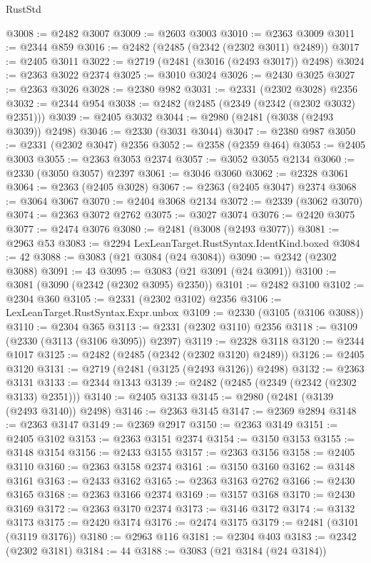 \begin{lexlean}{RustStd}
\begin{coremodule}
@3008 := @2482 @3007
@3009 := @2603 @3003
@3010 := @2363 @3009
@3011 := @2344 @859
@3016 := @2482 (@2485 (@2342 (@2302 @3011) @2489))
@3017 := @2405 @3011
@3022 := @2719 (@2481 (@3016 (@2493 @3017)) @2498)
@3024 := @2363 @3022 @2374
@3025 := @3010 @3024
@3026 := @2430 @3025
@3027 := @2363 @3026
@3028 := @2380 @982
@3031 := @2331 (@2302 @3028) @2356
@3032 := @2344 @954
@3038 := @2482 (@2485 (@2349 (@2342 (@2302 @3032) @2351)))
@3039 := @2405 @3032
@3044 := @2980 (@2481 (@3038 (@2493 @3039)) @2498)
@3046 := @2330 (@3031 @3044)
@3047 := @2380 @987
@3050 := @2331 (@2302 @3047) @2356
@3052 := @2358 (@2359 @464)
@3053 := @2405 @3003
@3055 := @2363 @3053 @2374
@3057 := @3052 @3055 @2134
@3060 := @2330 (@3050 @3057) @2397
@3061 := @3046 @3060
@3062 := @2328 @3061
@3064 := @2363 (@2405 @3028)
@3067 := @2363 (@2405 @3047) @2374
@3068 := @3064 @3067
@3070 := @2404 @3068 @2134
@3072 := @2339 (@3062 @3070)
@3074 := @2363 @3072 @2762
@3075 := @3027 @3074
@3076 := @2420 @3075
@3077 := @2474 @3076
@3080 := @2481 (@3008 (@2493 @3077))
@3081 := @2963 @53
@3083 := @2294 LexLeanTarget.RustSyntax.IdentKind.boxed
@3084 := 42
@3088 := @3083 (@21 @3084 (@24 @3084))
@3090 := @2342 (@2302 @3088)
@3091 := 43
@3095 := @3083 (@21 @3091 (@24 @3091))
@3100 := @3081 (@3090 (@2342 (@2302 @3095) @2350))
@3101 := @2482 @3100
@3102 := @2304 @360
@3105 := @2331 (@2302 @3102) @2356
@3106 := LexLeanTarget.RustSyntax.Expr.unbox
@3109 := @2330 (@3105 (@3106 @3088))
@3110 := @2304 @365
@3113 := @2331 (@2302 @3110) @2356
@3118 := @3109 (@2330 (@3113 (@3106 @3095)) @2397)
@3119 := @2328 @3118
@3120 := @2344 @1017
@3125 := @2482 (@2485 (@2342 (@2302 @3120) @2489))
@3126 := @2405 @3120
@3131 := @2719 (@2481 (@3125 (@2493 @3126)) @2498)
@3132 := @2363 @3131
@3133 := @2344 @1343
@3139 := @2482 (@2485 (@2349 (@2342 (@2302 @3133) @2351)))
@3140 := @2405 @3133
@3145 := @2980 (@2481 (@3139 (@2493 @3140)) @2498)
@3146 := @2363 @3145
@3147 := @2369 @2894
@3148 := @2363 @3147
@3149 := @2369 @2917
@3150 := @2363 @3149
@3151 := @2405 @3102
@3153 := @2363 @3151 @2374
@3154 := @3150 @3153
@3155 := @3148 @3154
@3156 := @2433 @3155
@3157 := @2363 @3156
@3158 := @2405 @3110
@3160 := @2363 @3158 @2374
@3161 := @3150 @3160
@3162 := @3148 @3161
@3163 := @2433 @3162
@3165 := @2363 @3163 @2762
@3166 := @2430 @3165
@3168 := @2363 @3166 @2374
@3169 := @3157 @3168
@3170 := @2430 @3169
@3172 := @2363 @3170 @2374
@3173 := @3146 @3172
@3174 := @3132 @3173
@3175 := @2420 @3174
@3176 := @2474 @3175
@3179 := @2481 (@3101 (@3119 @3176))
@3180 := @2963 @116
@3181 := @2304 @403
@3183 := @2342 (@2302 @3181)
@3184 := 44
@3188 := @3083 (@21 @3184 (@24 @3184))

\end{coremodule}
\end{lexlean}
